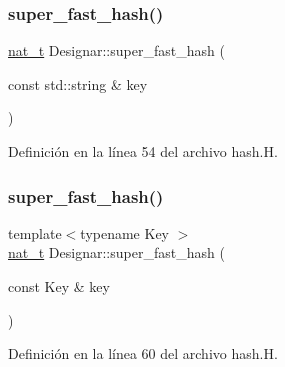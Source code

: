 \subsubsection{\texorpdfstring{super\+\_\+fast\+\_\+hash()}{super\_fast\_hash()}\hspace{0.1cm}{\footnotesize\ttfamily [3/5]}}
{\footnotesize\ttfamily \hyperlink{namespace_designar_aa72662848b9f4815e7bf31a7cf3e33d1}{nat\+\_\+t} Designar\+::super\+\_\+fast\+\_\+hash (\begin{DoxyParamCaption}\item[{const std\+::string \&}]{key }\end{DoxyParamCaption})\hspace{0.3cm}{\ttfamily [inline]}}



Definición en la línea 54 del archivo hash.\+H.

\mbox{\label{namespace_designar_a1996522f2f70bdf5dc5659a5a0e42c86}} 
\subsubsection{\texorpdfstring{super\+\_\+fast\+\_\+hash()}{super\_fast\_hash()}\hspace{0.1cm}{\footnotesize\ttfamily [4/5]}}
{\footnotesize\ttfamily template$<$typename Key $>$ \\
\hyperlink{namespace_designar_aa72662848b9f4815e7bf31a7cf3e33d1}{nat\+\_\+t} Designar\+::super\+\_\+fast\+\_\+hash (\begin{DoxyParamCaption}\item[{const Key \&}]{key }\end{DoxyParamCaption})\hspace{0.3cm}{\ttfamily [inline]}}



Definición en la línea 60 del archivo hash.\+H.

\mbox{\label{namespace_designar_af31e2906f9449591dfe3b6380768ad44}} 
